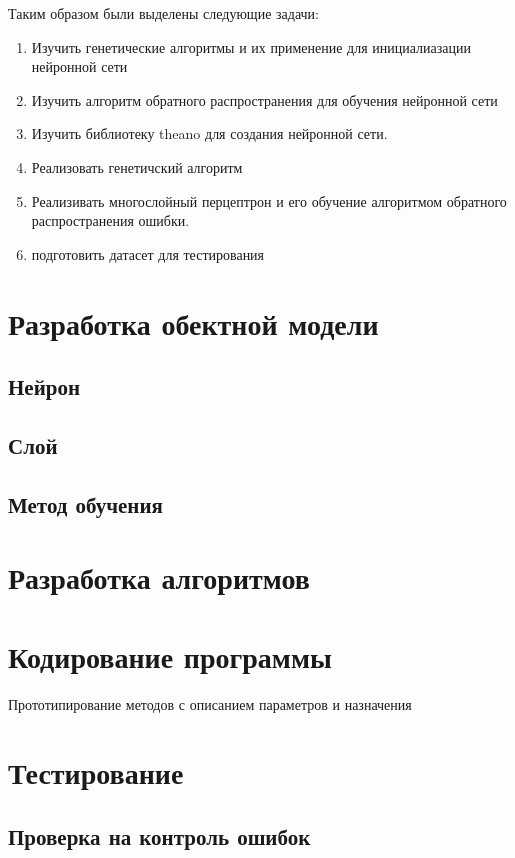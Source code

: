\documentclass[a4paper,12pt]{article}
\begin{document}
\par Таким образом были выделены следующие задачи:
\begin{enumerate}
\item Изучить генетические алгоритмы и их применение для инициалиазации нейронной сети
\item Изучить алгоритм обратного распространения для обучения нейронной сети
\item Изучить библиотеку theano для создания нейронной сети.
\item Реализовать генетичский алгоритм
\item Реализивать многослойный перцептрон и его обучение алгоритмом обратного распространения ошибки.
\item подготовить датасет для тестирования
\end{enumerate}

\newpage\section{Разработка обектной модели}

\subsection{Нейрон}
\subsection{Слой}
\subsection{Метод обучения}

\newpage\section{Разработка алгоритмов}

\newpage\section{Кодирование программы}
Прототипирование методов с описанием параметров и назначения

\newpage\section{Тестирование}
\subsection{Проверка на контроль ошибок}
\end{document}
